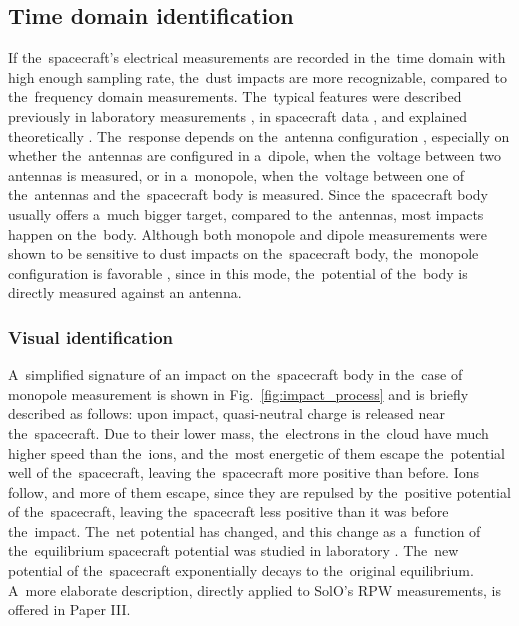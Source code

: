 \subsection{Time domain identification}

If the~spacecraft's electrical measurements are recorded in the~time domain with high enough sampling rate, the~dust impacts are more recognizable, compared to the~frequency domain measurements. The~typical features were described previously in laboratory measurements \citep{auer1968,nouzak2018laboratory,shen2021laboratory,shen2023variability}, in spacecraft data \citep{zaslavsky2012interplanetary,kellogg2016dust,vaverka2021ion}, and explained theoretically \citep{zaslavsky2015floating,meyer2017frequency,shen2021electrostatic,babic2022analytical}. The~response depends on the~antenna configuration \citep{shen2023variability,vaverka2021ion}, especially on whether the~antennas are configured in a~dipole, when the~voltage between two antennas is measured, or in a~monopole, when the~voltage between one of the~antennas and the~spacecraft body is measured. Since the~spacecraft body usually offers a~much bigger target, compared to the~antennas, most impacts happen on the~body. Although both monopole and dipole measurements were shown to be sensitive to dust impacts on the~spacecraft body, the~monopole configuration is favorable \citep{meyer2014importance,mann2019dust}, since in this mode, the~potential of the~body is directly measured against an antenna. 

\subsubsection{Visual identification}

A~simplified signature of an impact on the~spacecraft body in the~case of monopole measurement is shown in Fig.~\ref{fig:impact_process} and is briefly described as follows: upon impact, quasi-neutral charge is released near the~spacecraft. Due to their lower mass, the~electrons in the~cloud have much higher speed than the~ions, and the~most energetic of them escape the~potential well of the~spacecraft, leaving the~spacecraft more positive than before. Ions follow, and more of them escape, since they are repulsed by the~positive potential of the~spacecraft, leaving the~spacecraft less positive than it was before the~impact. The~net potential has changed, and this change as a~function of the~equilibrium spacecraft potential was studied in laboratory \citep{collette2016characteristic,kovcivsvcak2020effective}. The~new potential of the~spacecraft exponentially decays to the~original equilibrium. A~more elaborate description, directly applied to SolO's RPW measurements, is offered in Paper III.

